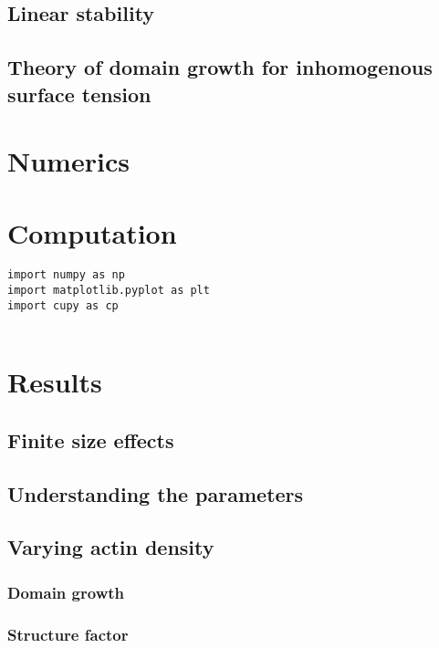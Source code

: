 \documentclass[a4paper,11pt]{custom}
\begin{document}
\subsection{Linear stability}
\label{sec:org95de8c0}

\subsection{Theory of domain growth for inhomogenous surface tension}
\label{sec:orgf0b53b3}

\section{Numerics}
\label{sec:orgfcffd63}

\section{Computation}
\label{sec:org0c2e7d0}

\begin{verbatim}
import numpy as np
import matplotlib.pyplot as plt
import cupy as cp


\end{verbatim}

\section{Results}
\label{sec:orga1c6ad1}

\subsection{Finite size effects}
\label{sec:org5b956f8}

\subsection{Understanding the parameters}
\label{sec:org21e2d8d}

\subsection{Varying actin density}
\label{sec:org2427f1f}

\subsubsection{Domain growth}
\label{sec:orgcadea09}

\subsubsection{Structure factor}
\label{sec:org540078f}
\end{document}
